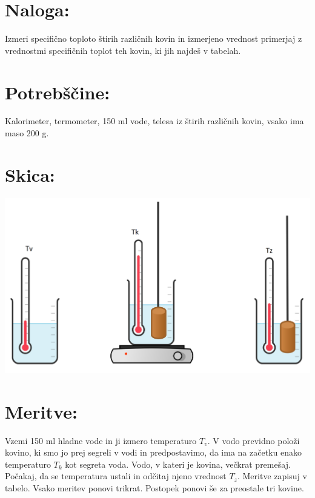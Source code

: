 \documentclass[a4paper]{article}
\begin{document}



\section*{Naloga:} %

Izmeri specifično toploto štirih različnih kovin in izmerjeno vrednost primerjaj z vrednostmi specifičnih toplot teh kovin, ki jih najdeš v tabelah. 

\section*{Potrebščine:}

Kalorimeter, termometer, 150 ml vode, telesa iz štirih različnih kovin, vsako ima maso 200 g.

\section*{Skica:}

\includegraphics[scale=0.5]{skica.png}

\section*{Meritve:}

Vzemi 150 ml hladne vode in ji izmero temperaturo $T_v.$ V vodo previdno položi kovino, ki smo jo prej segreli v vodi in predpostavimo, da ima na začetku enako temperaturo $T_k$  kot segreta voda. Vodo, v kateri je kovina, večkrat premešaj. Počakaj, da se temperatura ustali in odčitaj njeno vrednost $T_z$. Meritve zapisuj v tabelo. Vsako meritev ponovi trikrat. Postopek ponovi še za preostale tri kovine.
\end{document}
